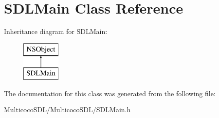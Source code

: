 \hypertarget{interface_s_d_l_main}{\section{S\-D\-L\-Main Class Reference}
\label{interface_s_d_l_main}
}
Inheritance diagram for S\-D\-L\-Main\-:\begin{figure}[H]
\begin{center}
\leavevmode
\includegraphics[height=2.000000cm]{interface_s_d_l_main}
\end{center}
\end{figure}


The documentation for this class was generated from the following file\-:\begin{DoxyCompactItemize}
\item 
Multicoco\-S\-D\-L/\-Multicoco\-S\-D\-L/S\-D\-L\-Main.\-h\end{DoxyCompactItemize}
